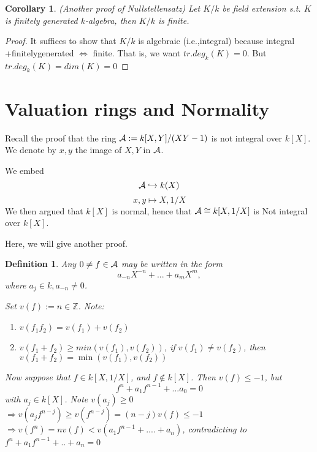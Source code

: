 \documentclass[11pt]{article}
\newtheorem{cor}[thm]{Corollary}
\newtheorem{dfn}[thm]{Definition}
\newcommand{\intg}{\mathbb Z}
\newcommand{\cala}{{\cal A}}
\newcommand{\Lrta}{\Longrightarrow}
\newcommand{\Llrta}{\Longleftrightarrow}
\newcommand{\inj}{\hookrightarrow}
\begin{document}
\begin{cor}
(Another proof of Nullstellensatz) Let $K/k$ be field extension s.t. $K$ is finitely generated $k$-algebra, then $K/k$ is finite.
\end{cor}
\begin{proof}
It suffices to show that $K/k$ is algebraic (i.e.,integral) because integral +finitelygenerated $\Llrta$ finite. That is, we want $tr.deg_k(K)=0$. But $tr.deg_k(K)=dim(K)=0$
\end{proof}


\section{Valuation rings and Normality}
Recall the proof that the ring $\cala:=k[X,Y]/(XY-1)$ is not integral over $k[X]$. We denote by $x,y$ the image of $X,Y$ in $\cala$.

We embed 
$$\cala\inj k(X)$$
$$
x,y\longmapsto X,1/X
$$
We then argued that $k[X]$ is normal, hence that $\cala \cong k[X,1/X]$ is Not integral over $k[X]$.

Here, we will give another proof.
\begin{dfn}
Any $0\neq f\in\cala$ may be written in the form
$$
a_{-n}X^{-n}+...+a_m X^{m},
$$
where $a_j\in k, a_{-n}\neq 0$.

Set $v(f):=n\in \intg$.
Note:
\begin{enumerate}
\item 
$
v(f_1f_2)=v(f_1)+v(f_2)
$
\item $v(f_1+f_2)\geq min(v(f_1),v(f_2))$, if $v(f_1)\neq v(f_2)$, then $v(f_1+f_2)=\min (v(f_1),v(f_2))$
\end{enumerate}

Now suppose that $f\in k[X,1/X]$, and $f\notin k[X]$. Then $v(f)\leq -1$, but 
$$
f^n+a_1 f^{n-1}+...a_0=0
$$
with $a_{j}\in k[X]$. Note $v(a_j)\geq 0$\\
$\Lrta v(a_j f^{n-j})\geq v(f^{n-j})=(n-j)v(f)\leq -1$\\
$\Lrta v(f^n)=nv(f)< v(a_1 f^{n-1}+....+a_n)$, contradicting to $f^n+a_1 f^{n-1}+..+a_n=0$
\end{dfn}
\end{document}
